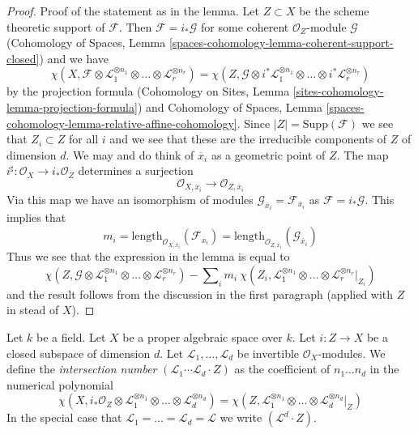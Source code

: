 \begin{proof}
\medskip\noindent
Proof of the statement as in the lemma.
Let $Z \subset X$ be the scheme theoretic support of $\mathcal{F}$.
Then $\mathcal{F} = i_*\mathcal{G}$ for some coherent
$\mathcal{O}_Z$-module $\mathcal{G}$
(Cohomology of Spaces, Lemma
\ref{spaces-cohomology-lemma-coherent-support-closed})
and we have
$$
\chi(X, \mathcal{F} \otimes
\mathcal{L}_1^{\otimes n_1} \otimes \ldots \otimes
\mathcal{L}_r^{\otimes n_r}) =
\chi(Z, \mathcal{G} \otimes
i^*\mathcal{L}_1^{\otimes n_1} \otimes \ldots \otimes
i^*\mathcal{L}_r^{\otimes n_r})
$$
by the projection formula
(Cohomology on Sites, Lemma \ref{sites-cohomology-lemma-projection-formula})
and Cohomology of Spaces, Lemma
\ref{spaces-cohomology-lemma-relative-affine-cohomology}.
Since $|Z| = \text{Supp}(\mathcal{F})$ we see that $Z_i \subset Z$
for all $i$ and we see that these are the irreducible components
of $Z$ of dimension $d$. We may and do think of $\overline{x}_i$
as a geometric point of $Z$. The map
$i^\sharp : \mathcal{O}_X \to i_*\mathcal{O}_Z$
determines a surjection
$$
\mathcal{O}_{X, \overline{x}_i} \to \mathcal{O}_{Z, \overline{x}_i}
$$
Via this map we have an isomorphism of modules
$\mathcal{G}_{\overline{x}_i} = \mathcal{F}_{\overline{x}_i}$
as $\mathcal{F} = i_*\mathcal{G}$. This implies that
$$
m_i = \text{length}_{\mathcal{O}_{X, \overline{x}_i}}
(\mathcal{F}_{\overline{x}_i}) =
\text{length}_{\mathcal{O}_{Z, \overline{x}_i}}
(\mathcal{G}_{\overline{x}_i})
$$
Thus we see that the expression in the lemma is equal to
$$
\chi(Z, \mathcal{G} \otimes \mathcal{L}_1^{\otimes n_1} \otimes \ldots \otimes
\mathcal{L}_r^{\otimes n_r}) -
\sum\nolimits_i
m_i\ \chi(Z_i, \mathcal{L}_1^{\otimes n_1} \otimes \ldots \otimes
\mathcal{L}_r^{\otimes n_r}|_{Z_i})
$$
and the result follows from the discussion in the first paragraph
(applied with $Z$ in stead of $X$).
\end{proof}

\begin{definition}
\label{definition-intersection-number}
Let $k$ be a field. Let $X$ be a proper algebraic space over $k$. Let
$i : Z \to X$ be a closed subspace of dimension $d$. Let
$\mathcal{L}_1, \ldots, \mathcal{L}_d$ be invertible
$\mathcal{O}_X$-modules. We define the {\it intersection number}
$(\mathcal{L}_1 \cdots \mathcal{L}_d \cdot Z)$
as the coefficient of $n_1 \ldots n_d$ in the numerical polynomial
$$
\chi(X, i_*\mathcal{O}_Z \otimes \mathcal{L}_1^{\otimes n_1} \otimes
\ldots \otimes \mathcal{L}_d^{\otimes n_d}) =
\chi(Z, \mathcal{L}_1^{\otimes n_1} \otimes
\ldots \otimes \mathcal{L}_d^{\otimes n_d}|_Z)
$$
In the special
case that $\mathcal{L}_1 = \ldots = \mathcal{L}_d = \mathcal{L}$
we write $(\mathcal{L}^d \cdot Z)$.
\end{definition}

